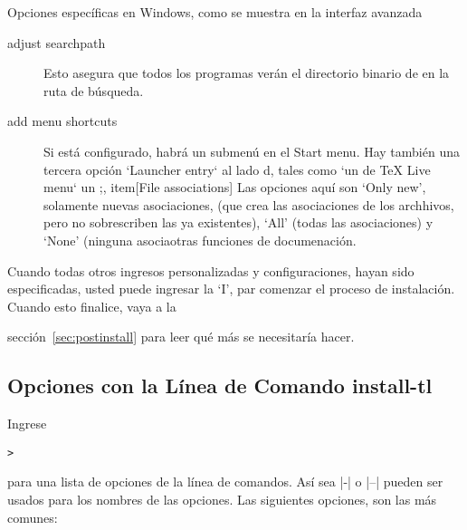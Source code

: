\documentclass{article}
\begin{document}
Opciones específicas en Windows, como se muestra en la interfaz avanzada \GUI{}

\begin{description}
\item[adjust searchpath] Esto asegura que todos los programas verán el directorio binario de \TL{} en la ruta de búsqueda. 

\item[add menu shortcuts] Si está configurado, habrá un submenú \TL{} en el Start menu. Hay también una tercera opción `Launcher entry` al lado d,
 tales como  `un \GUI{} de TeX Live menu` un
 ;, item[File associations] Las opciones aquí son `Only new', solamente nuevas asociaciones, (que crea las asociaciones de los archhivos, pero no sobrescriben las ya existentes), `All' (todas las asociaciones) y `None' (ninguna
asociaotras funciones de documenación.


\end{description}

Cuando todas otros ingresos personalizadas y configuraciones, hayan
sido especificadas, usted puede ingresar la `I', par comenzar el
proceso de instalación.  Cuando esto finalice, vaya a la

sección~\ref{sec:postinstall} para leer qué más se necesitaría hacer. 

\subsection{Opciones con la Línea de Comando install-tl}
\label{sec:cmdline}


Ingrese 
\begin{alltt}

	> 
\end{alltt}

para una lista de opciones de la línea de comandos. Así sea |-|
o |--| pueden ser usados para los nombres de las opciones. Las
siguientes opciones, son las más comunes:

\ 
\end{document}

